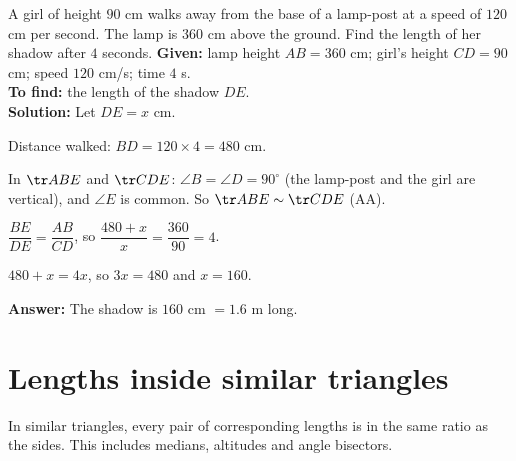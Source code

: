 \begin{example}
A girl of height $90$ cm walks away from the base of a lamp-post at a speed of $120$ cm per second. The lamp is $360$ cm above the ground. Find the length of her shadow after $4$ seconds.
\textbf{Given:} lamp height $AB=360$ cm; girl's height $CD=90$ cm; speed $120$ cm/s; time $4$ s.\\
\textbf{To find:} the length of the shadow $DE$.\\
\textbf{Solution:} Let $DE=x$ cm.
\begin{steps}
  \item Distance walked: $BD=120\times4=480$ cm.
  \item In $\tr ABE$ and $\tr CDE$: $\angle B=\angle D=90^\circ$ (the lamp-post and the girl are vertical), and $\angle E$ is common. So $\tr ABE\sim\tr CDE$ (AA).
  \item $\dfrac{BE}{DE}=\dfrac{AB}{CD}$, so $\dfrac{480+x}{x}=\dfrac{360}{90}=4$.
  \item $480+x=4x$, so $3x=480$ and $x=160$.
\end{steps}
\textbf{Answer:} The shadow is $160$ cm $=1.6$ m long.
\end{example}

\section{Lengths inside similar triangles}

In similar triangles, every pair of corresponding lengths is in the same ratio as the sides. This includes medians, altitudes and angle bisectors.

